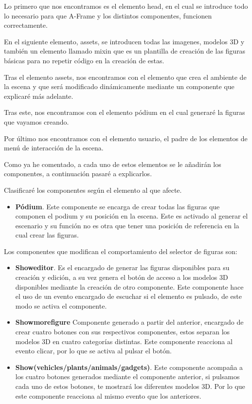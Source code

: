\documentclass[a4paper, 12pt]{book}
\begin{document}
Lo primero que nos encontramos es el elemento head, en el cual  se introduce todo lo necesario para que A-Frame y los distintos componentes, funcionen correctamente.

En el siguiente elemento, assets, se introducen todas las imagenes, modelos 3D y también un elemento llamado mixin que es un plantilla de creación de las figuras básicas para no repetir código en la creación de estas.

Tras el elemento assets, nos encontramos con el elemento que crea el ambiente de la escena y que será modificado dinámicamente mediante un componente que explicaré más adelante.

Tras este, nos encontramos con el elemento pódium en el cual generaré la figuras que vayamos creando.

Por último nos encontramos con el elemento usuario, el  padre de los elementos de menú de interacción de la escena.

Como ya he comentado, a cada uno de estos elementos se le añadirán los componentes, a continuación pasaré a explicarlos.

Clasificaré los componentes según el elemento al que afecte.

\begin{itemize}
    \item \textbf{Pódium}. Este componente se encarga de crear todas las figuras que componen el podium y su posición en la escena. Este es activado al generar el escenario y su función no es otra que tener una posición de referencia en la cual crear las figuras.
\end{itemize}

Los componentes que modifican el comportamiento del selector de figuras son:
\begin{itemize}
    \item \textbf{Showeditor}. Es el encargado de generar las figuras disponibles para su creación y edición, a su vez genera el botón de acceso a los modelos 3D disponibles mediante la creación de otro componente. Este componente hace el uso de un evento encargado de escuchar si el elemento es pulsado, de este modo se activa el componente.
    
    \item \textbf{Showmorefigure} Componente generado a partir del anterior, encargado de crear cuatro botones con sus respectivos componentes, estos separan los modelos 3D en cuatro categorías distintas. Este componente reacciona al evento clicar, por lo que se activa al pulsar el botón.

    \item \textbf{Show(vehicles/plants/animals/gadgets)}. Este componente acompaña a los cuatro botones generados mediante el componente anterior, si pulsamos cada uno de estos botones, te mostrará los diferentes modelos 3D. Por lo que este componente reacciona al mismo evento que los anteriores.

\end{itemize}
\end{document}
